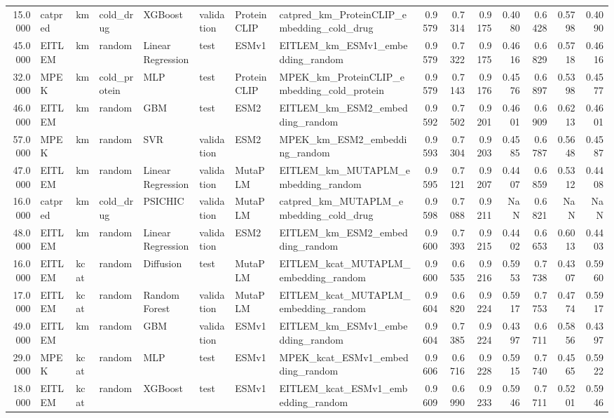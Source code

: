 \begin{tabular}{rlllllllrrrrrrr}
15.0000 & catpred & km & cold_drug & XGBoost & validation & ProteinCLIP & catpred_km_ProteinCLIP_embedding_cold_drug & 0.9579 & 0.7314 & 0.9175 & 0.4080 & 0.6428 & 0.5798 & 0.4090 \\
45.0000 & EITLEM & km & random & Linear Regression & test & ESMv1 & EITLEM_km_ESMv1_embedding_random & 0.9579 & 0.7322 & 0.9175 & 0.4616 & 0.6829 & 0.5718 & 0.4616 \\
32.0000 & MPEK & km & cold_protein & MLP & test & ProteinCLIP & MPEK_km_ProteinCLIP_embedding_cold_protein & 0.9579 & 0.7143 & 0.9176 & 0.4576 & 0.6897 & 0.5398 & 0.4577 \\
46.0000 & EITLEM & km & random & GBM & test & ESM2 & EITLEM_km_ESM2_embedding_random & 0.9592 & 0.7502 & 0.9201 & 0.4601 & 0.6909 & 0.6213 & 0.4601 \\
57.0000 & MPEK & km & random & SVR & validation & ESM2 & MPEK_km_ESM2_embedding_random & 0.9593 & 0.7304 & 0.9203 & 0.4585 & 0.6787 & 0.5648 & 0.4587 \\
47.0000 & EITLEM & km & random & Linear Regression & validation & MutaPLM & EITLEM_km_MUTAPLM_embedding_random & 0.9595 & 0.7121 & 0.9207 & 0.4407 & 0.6859 & 0.5312 & 0.4408 \\
16.0000 & catpred & km & cold_drug & PSICHIC & validation & MutaPLM & catpred_km_MUTAPLM_embedding_cold_drug & 0.9598 & 0.7088 & 0.9211 & NaN & 0.6821 & NaN & NaN \\
48.0000 & EITLEM & km & random & Linear Regression & validation & ESM2 & EITLEM_km_ESM2_embedding_random & 0.9600 & 0.7393 & 0.9215 & 0.4402 & 0.6653 & 0.6013 & 0.4403 \\
16.0000 & EITLEM & kcat & random & Diffusion & test & MutaPLM & EITLEM_kcat_MUTAPLM_embedding_random & 0.9600 & 0.6535 & 0.9216 & 0.5953 & 0.7738 & 0.4307 & 0.5960 \\
17.0000 & EITLEM & kcat & random & Random Forest & validation & MutaPLM & EITLEM_kcat_MUTAPLM_embedding_random & 0.9604 & 0.6820 & 0.9224 & 0.5917 & 0.7753 & 0.4774 & 0.5917 \\
49.0000 & EITLEM & km & random & GBM & validation & ESMv1 & EITLEM_km_ESMv1_embedding_random & 0.9604 & 0.7385 & 0.9224 & 0.4397 & 0.6711 & 0.5856 & 0.4397 \\
29.0000 & MPEK & kcat & random & MLP & test & ESMv1 & MPEK_kcat_ESMv1_embedding_random & 0.9606 & 0.6716 & 0.9228 & 0.5915 & 0.7740 & 0.4565 & 0.5922 \\
18.0000 & EITLEM & kcat & random & XGBoost & test & ESMv1 & EITLEM_kcat_ESMv1_embedding_random & 0.9609 & 0.6990 & 0.9233 & 0.5946 & 0.7711 & 0.5201 & 0.5946 \\

\end{tabular}
